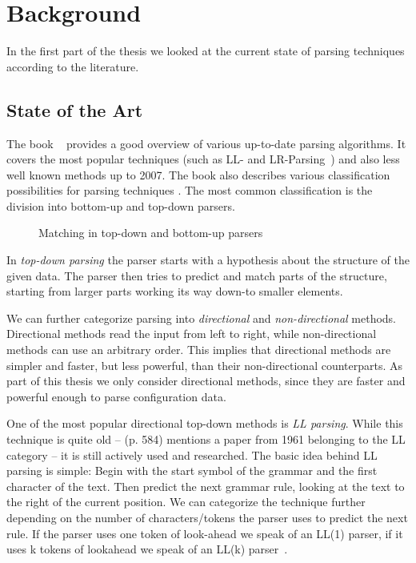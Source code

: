 \chapter{Background}

In the first part of the thesis we looked at the current state of parsing techniques according to the literature.

\section{State of the Art}

The book ~\cite{grune2007parsing} provides a good overview of various up-to-date parsing algorithms. It covers the most popular techniques (such as LL- and LR-Parsing~\cite{knuth1965translation}) and also less well known methods up to 2007. The book also describes various classification possibilities for parsing techniques \cite[p. 85]{grune2007parsing}. The most common classification is the division into bottom-up and top-down parsers.

\begin{figure}
   \centering
   \qquad
   \caption{Matching in top-down and bottom-up parsers}
 \end{figure}

In \emph{top-down parsing} the parser starts with a hypothesis about the structure of the given data. The parser then tries to predict and match parts of the structure, starting from larger parts working its way down-to smaller elements.

We can further categorize parsing into \emph{directional} and \emph{non-directional} methods. Directional methods read the input from left to right, while non-directional methods can use an arbitrary order. This implies that directional methods are simpler and faster, but less powerful, than their non-directional counterparts. As part of this thesis we only consider directional methods, since they are faster and powerful enough to parse configuration data.

One of the most popular directional top-down methods is \emph{LL parsing}. While this technique is quite old –  (p. 584) mentions a paper from 1961 belonging to the LL category – it is still actively used and researched. The basic idea behind LL parsing is simple: Begin with the start symbol of the grammar and the first character of the text. Then predict the next grammar rule, looking at the text to the right of the current position. We can categorize the technique further depending on the number of characters/tokens the parser uses to predict the next rule. If the parser uses one token of look-ahead we speak of an LL(1) parser, if it uses k tokens of lookahead we speak of an LL(k) parser~\cite{rosenkrantz1969properties}.

